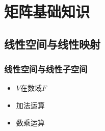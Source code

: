 \chapter{矩阵基础知识}
\label{cha:矩阵基础知识}

\section{线性空间与线性映射}
\label{sec:线性空间与线性映射}

\subsection{线性空间与线性子空间}
\label{sub:线性空间与线性子空间}

\begin{definition}
    \begin{itemize}
        \item $V$在数域$F$
        \item 加法运算
        \item 数乘运算
    \end{itemize}
\end{definition}

